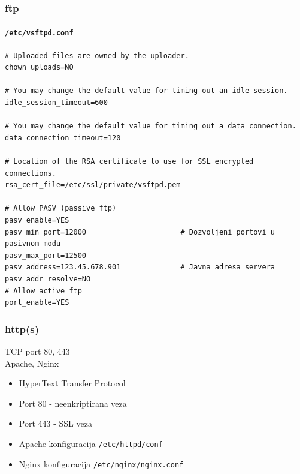 \documentclass[t,table,usenames,dvipsnames]{beamer}
\begin{document}
\begin{frame}[fragile]
	\frametitle{ftp}
	\framesubtitle{\texttt{/etc/vsftpd.conf}}
	\scriptsize
	\begin{verbatim}
# Uploaded files are owned by the uploader.
chown_uploads=NO

# You may change the default value for timing out an idle session.
idle_session_timeout=600

# You may change the default value for timing out a data connection.
data_connection_timeout=120

# Location of the RSA certificate to use for SSL encrypted connections.
rsa_cert_file=/etc/ssl/private/vsftpd.pem

# Allow PASV (passive ftp)
pasv_enable=YES
pasv_min_port=12000                      # Dozvoljeni portovi u pasivnom modu
pasv_max_port=12500
pasv_address=123.45.678.901              # Javna adresa servera
pasv_addr_resolve=NO
# Allow active ftp
port_enable=YES
	\end{verbatim}


\end{frame}

\begin{frame}
	\frametitle{http(s)}
	
	TCP port 80, 443\\
	Apache, Nginx
	
	\begin{itemize}
		\item[] HyperText Transfer Protocol
		
		\item[] Port 80 - neenkriptirana veza
		\item[] Port 443 - SSL veza
	\end{itemize}
	
	\begin{itemize}
		\item[] Apache konfiguracija \texttt{/etc/httpd/conf}
		\item[] Nginx konfiguracija \texttt{/etc/nginx/nginx.conf}
	\end{itemize}

\end{frame}
\end{document}
